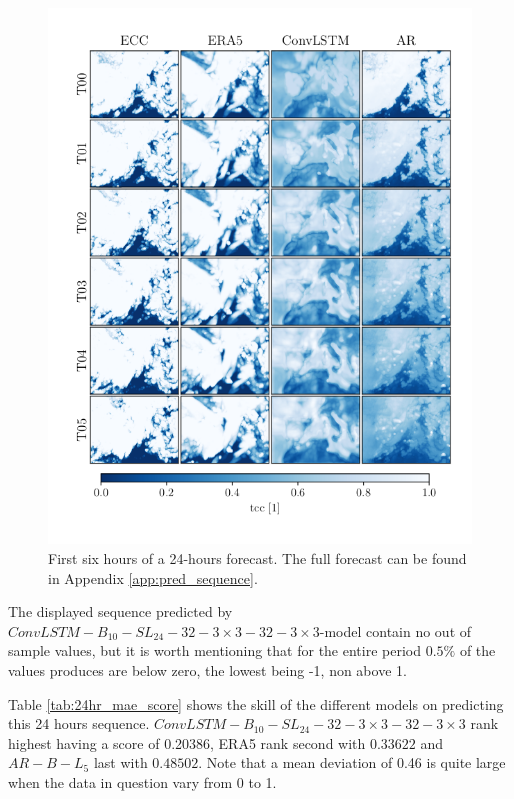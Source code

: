 \begin{figure}[ht]
    \centering
    \includegraphics[sale=0.1]{python_figs/comparing_seq_part_1_of4_jan2.png}
    \caption{First six hours of a 24-hours forecast. The full forecast can be found in Appendix \ref{app:pred_sequence}.}
    \label{fig:pred_sequence}
\end{figure}

The displayed sequence predicted by $ConvLSTM-B_{10}-SL_{24}-32-3\times3-32-3 \times3$-model contain no out of sample values, but it is worth mentioning that for the entire period $0.5\%$ of the values produces are below zero, the lowest being -1, non above 1. 

Table \ref{tab:24hr_mae_score} shows the skill of the different models on predicting this 24 hours sequence. $ConvLSTM-B_{10}-SL_{24}-32-3\times3-32-3\times3$ rank highest having a score of 0.20386, ERA5 rank second with  $0.33622$ and $AR-B-L_5$ last with  $0.48502$. Note that a mean deviation of 0.46 is quite large when the data in question vary from 0 to 1. 


